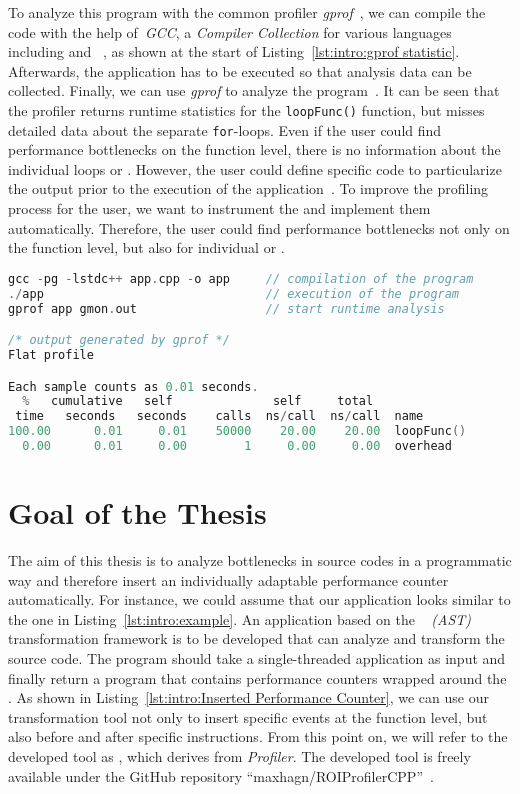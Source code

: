 To analyze this program with the common profiler \emph{gprof}~\cite{gProfInformations}, we can compile the code with the help of~\emph{GCC}, a \emph{Compiler Collection} for various languages including \C and \CPP~\cite{GnuLanding}, as shown at the start of Listing~\ref{lst:intro:gprof statistic}. Afterwards, the application has to be executed so that analysis data can be collected. Finally, we can use \emph{gprof} to analyze the program~\cite{gprofworkflow}. It can be seen that the profiler returns runtime statistics for the \lstinline{loopFunc()} function, but misses detailed data about the separate \lstinline{for}-loops. Even if the user could find performance bottlenecks on the function level, there is no information about the individual loops or \DECL \STATS. However, the user could define specific code \roismall to particularize the output prior to the execution of the application~\cite{specifybeforrungprof}. To improve the profiling process for the user, we want to instrument the \roismall and implement them automatically. Therefore, the user could find performance bottlenecks not only on the function level, but also for individual \STATS or \declssmall. 

\begin{lstlisting}[float, language=C++, caption=The Compilation and Execution of the \emph{gprof} Profiler., label=lst:intro:gprof statistic]
gcc -pg -lstdc++ app.cpp -o app     // compilation of the program
./app                               // execution of the program
gprof app gmon.out                  // start runtime analysis

/* output generated by gprof */
Flat profile

Each sample counts as 0.01 seconds.
  %   cumulative   self              self     total
 time   seconds   seconds    calls  ns/call  ns/call  name
100.00      0.01     0.01    50000    20.00    20.00  loopFunc()
  0.00      0.01     0.00        1     0.00     0.00  overhead
\end{lstlisting}

\section{Goal of the Thesis}
The aim of this thesis is to analyze bottlenecks in \CPP source codes in a programmatic way and therefore insert an individually adaptable performance counter automatically. For instance, we could assume that our application looks similar to the one in Listing~\ref{lst:intro:example}. An application based on the \CLANG~\cite{ClangLanding} \AST\emph{(AST)} transformation framework is to be developed that can analyze and transform the source code. The program should take a single-threaded \CPP application as input and finally return a program that contains performance counters wrapped around the \roismall. As shown in Listing~\ref{lst:intro:Inserted Performance Counter}, we can use our transformation tool not only to insert specific events at the function level, but also before and after specific instructions. From this point on, we will refer to the developed tool as \TOOL, which derives from \ROI\emph{Profiler}. The developed tool is freely available under the GitHub repository ``maxhagn/ROIProfilerCPP''~\cite{ROIPROFILER}.

